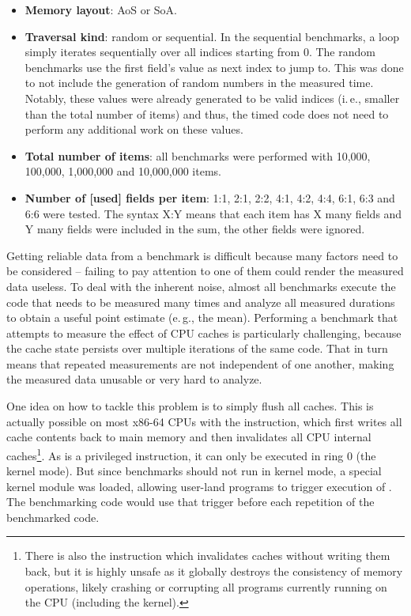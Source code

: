 \begin{itemize}
  \item \textbf{Memory layout}: AoS or SoA.
  \item \textbf{Traversal kind}: random or sequential.
  In the sequential benchmarks, a loop simply iterates sequentially over all indices starting from 0.
  The random benchmarks use the first field's  value as next index to jump to.
  This was done to not include the generation of random numbers in the measured time.
  Notably, these  values were already generated to be valid indices (i.\,e., smaller than the total number of items) and thus, the timed code does not need to perform any additional work on these values.
  \item \textbf{Total number of items}: all benchmarks were performed with 10,000, 100,000, 1,000,000 and 10,000,000 items.
  \item \textbf{Number of [used] fields per item}: 1:1, 2:1, 2:2, 4:1, 4:2, 4:4, 6:1, 6:3 and 6:6 were tested.
  The syntax X:Y means that each item has X many fields and Y many fields were included in the sum, the other fields were ignored.
\end{itemize}

\vfill

Getting reliable data from a benchmark is difficult because many factors need to be considered -- failing to pay attention to one of them could render the measured data useless.
To deal with the inherent noise, almost all benchmarks execute the code that needs to be measured many times and analyze all measured durations to obtain a useful point estimate (e.\,g., the mean).
Performing a benchmark that attempts to measure the effect of CPU caches is particularly challenging, because the cache state persists over multiple iterations of the same code.
That in turn means that repeated measurements are not independent of one another, making the measured data unusable or very hard to analyze.

\newpage
One idea on how to tackle this problem is to simply flush all caches.
This is actually possible on most x86-64 CPUs with the  instruction, which first writes all cache contents back to main memory and then invalidates all CPU internal caches\footnote{There is also the  instruction which invalidates caches without writing them back, but it is highly unsafe as it globally destroys the consistency of memory operations, likely crashing or corrupting all programs currently running on the CPU (including the kernel).}.
As  is a privileged instruction, it can only be executed in ring 0 (the kernel mode).
But since benchmarks should not run in kernel mode, a special kernel module was loaded, allowing user-land programs to trigger execution of .
The benchmarking code would use that trigger before each repetition of the benchmarked code.

